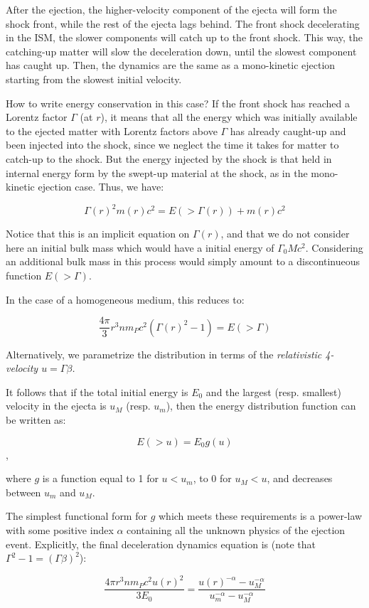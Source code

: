 After the ejection, the higher-velocity component of the ejecta will form the shock front, while the rest of the ejecta lags behind. The front shock decelerating in the ISM, the slower components will catch up to the front shock. This way, the catching-up matter will slow the deceleration down, until the slowest component has caught up. Then, the dynamics are the same as a mono-kinetic ejection starting from the slowest initial velocity.

How to write energy conservation in this case? If the front shock has reached a Lorentz factor $\Gamma$ (at $r$), it means that all the energy which was initially available to the ejected matter with Lorentz factors above $\Gamma$ has already caught-up and been injected into the shock, since we neglect the time it takes for matter to catch-up to the shock. But the energy injected by the shock is that held in internal energy form by the swept-up material at the shock, as in the mono-kinetic ejection case. Thus, we have:

$$ \Gamma(r)^2 m(r) c ^ 2 = E( > \Gamma(r)) + m(r) c ^ 2$$

Notice that this is an implicit equation on $\Gamma(r)$, and that we do not consider here an initial bulk mass which would have a initial energy of $\Gamma_0 M c^2$. Considering an additional bulk mass in this process would simply amount to a discontinueous function $ E( > \Gamma)$.

In the case of a homogeneous medium, this reduces to:

$$\frac{4\pi}{3}r^3 n m_P c^2(\Gamma(r)^2 - 1) = E( > \Gamma) $$


Alternatively, we parametrize the distribution in terms of the \it{relativistic 4-velocity} $u = \Gamma \beta$.

It follows that if the total initial energy is $E_0$ and the largest (resp. smallest) velocity in the ejecta is $u_M$ (resp. $u_m$), then the energy distribution function can be written as:

$$ E( > u) = E_0 g(u) $$,

where $g$ is a function equal to 1 for $u < u_m$, to 0 for $u_M < u$, and decreases between $u_m$ and $u_M$.

The simplest functional form for $g$ which meets these requirements is a power-law with some positive index $\alpha$  containing all the unknown physics of the ejection event. Explicitly, the final deceleration dynamics equation is (note that $\Gamma^2 - 1 = (\Gamma\beta)^2$):

$$\frac{4\pi r^3 n m_P c^2u(r)^2}{3 E_0} = \frac{u(r) ^ {-\alpha} - u_M^{-\alpha}}{u_m ^ {-\alpha} - u_M ^ {-\alpha}} $$

